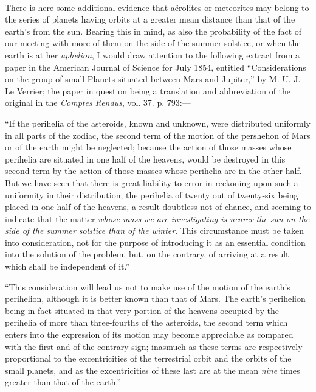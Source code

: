 \documentclass[a4paper, 12pt, oneside]{article}
\begin{document}
\paragraph{}
There is here some additional evidence that aërolites or meteorites may belong to the series of planets having orbits at a greater mean distance than that of the earth's from the sun. Bearing this in mind, as also the probability of the fact of our meeting with more of them on the side of the summer solstice, or when the earth is at her \emph{aphelion}, I would draw attention to the following extract from a paper in the American Journal of Science for July 1854, entitled ``Considerations on the group of small Planets situated between Mars and Jupiter,'' by M. U. J. Le Verrier; the paper in question being a translation and abbreviation of the original in the \emph{Comptes Rendus}, vol. 37. p. 793:---

``If the perihelia of the asteroids, known and unknown, were distributed uniformly in all parts of the zodiac, the second term of the motion of the pershehon of Mars or of the earth might be neglected; because the action of those masses whose perihelia are situated in one half of the heavens, would be destroyed in this second term by the action of those masses whose perihelia are in the other half. But we have seen that there is great liability to error in reckoning upon such a uniformity in their distribution; the perihelia of twenty out of twenty-six being placed in one half of the heavens, a result doubtless not of chance, and seeming to indicate that the matter \emph{whose mass we are investigating is nearer the sun on the side of the summer solstice than of the winter}. This circumstance must be taken into consideration, not for the purpose of introducing it as an essential condition into the solution of the problem, but, on the contrary, of arriving at a result which shall be independent of it.''

``This consideration will lead us not to make use of the motion of the earth's perihelion, although it is better known than that of Mars. The earth's perihelion being in fact situated in that very portion of the heavens occupied by the perihelia of more than three-fourths of the asteroids, the second term which enters into the expression of its motion may become appreciable as compared with the first and of the contrary sign; inasmuch as these terms are respectively proportional to the excentricities of the terrestrial orbit and the orbits of the small planets, and as the excentricities of these last are at the mean \emph{nine} times greater than that of the earth.''
\end{document}
